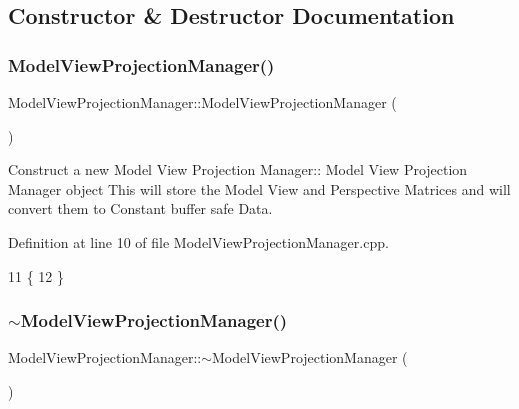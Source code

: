 \subsection{Constructor \& Destructor Documentation}
\mbox{\label{class_model_view_projection_manager_acf81b1fe0838094ca814ea3c8e5e3ba7}} 
\subsubsection{\texorpdfstring{Model\+View\+Projection\+Manager()}{ModelViewProjectionManager()}}
{\footnotesize\ttfamily Model\+View\+Projection\+Manager\+::\+Model\+View\+Projection\+Manager (\begin{DoxyParamCaption}{ }\end{DoxyParamCaption})}



Construct a new Model View Projection Manager\+:\+: Model View Projection Manager object This will store the Model View and Perspective Matrices and will convert them to Constant buffer safe Data. 



Definition at line 10 of file Model\+View\+Projection\+Manager.\+cpp.


\begin{DoxyCode}
11 \{
12 \}
\end{DoxyCode}
\mbox{\label{class_model_view_projection_manager_ae23209bae4e221dec901ea4fe79ba7ff}} 
\subsubsection{\texorpdfstring{$\sim$\+Model\+View\+Projection\+Manager()}{~ModelViewProjectionManager()}}
{\footnotesize\ttfamily Model\+View\+Projection\+Manager\+::$\sim$\+Model\+View\+Projection\+Manager (\begin{DoxyParamCaption}{ }\end{DoxyParamCaption})}



